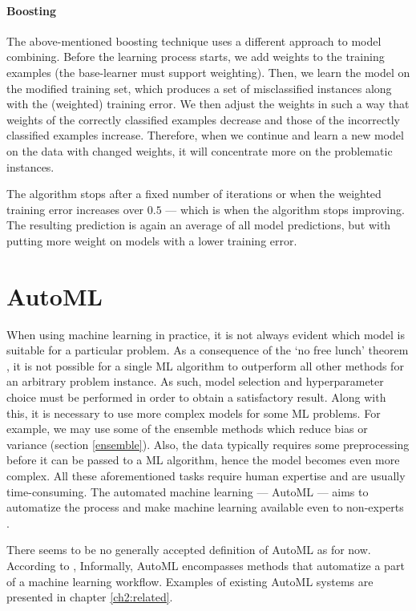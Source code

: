 \paragraph{Boosting} \label{boosting}
The above-mentioned boosting technique uses a different approach to model
combining. Before the learning process starts, we add weights to the training 
examples (the base-learner must support weighting). Then, we learn the model
on the modified training set, which produces a set of misclassified instances
along with the (weighted) training error. We then adjust the weights in such a
way that weights of the correctly classified examples decrease and those of
the incorrectly classified examples increase. Therefore, when we continue and
learn a new model on the data with changed weights, it will concentrate more 
on the problematic instances.

The algorithm stops after a fixed number of iterations or when the weighted
training error increases over $0.5$ --- which is when the algorithm stops
improving. The resulting prediction is again an average of all model
predictions, but with putting more weight on models with a lower training
error. \citep[335]{Flach:2012:MLA:2490546}

\section{AutoML} \label{sec:automl}
When using machine learning in practice, it is not always evident which model
is suitable for a particular problem. As a consequence of the `no free lunch'
theorem \citep{585893}, it is not possible for a single ML algorithm to
outperform all other methods for an arbitrary problem instance. As such, model
selection and hyperparameter choice must be performed in order to obtain a 
satisfactory result. Along with this, it is necessary to use more complex
models for some ML problems. For example, we may use some of the ensemble
methods which reduce bias or variance (section \ref{ensemble}). Also, the data
typically requires some preprocessing before it can be passed to a ML
algorithm, hence the model becomes even more complex. All these aforementioned
tasks require human  expertise and are usually time-consuming. The automated
machine learning --- AutoML --- aims to automatize the process and make
machine learning available even to non-experts \citep{Zller2019SurveyOA}.

There seems to be no generally accepted definition of AutoML as for now.
According to \cite{DBLP:journals/corr/abs-1810-13306},
Informally, AutoML encompasses methods that automatize a part of a machine
learning workflow. Examples of existing AutoML systems are presented in chapter
\ref{ch2:related}.

